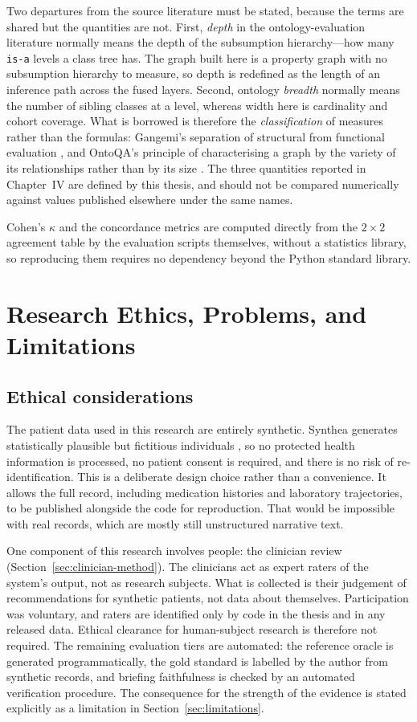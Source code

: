 Two departures from the source literature must be stated, because the terms are shared but
the quantities are not. First, \emph{depth} in the ontology-evaluation literature normally
means the depth of the subsumption hierarchy---how many \texttt{is-a} levels a class tree
has. The graph built here is a property graph with no subsumption hierarchy to measure, so
depth is redefined as the length of an inference path across the fused layers. Second,
ontology \emph{breadth} normally means the number of sibling classes at a level, whereas
width here is cardinality and cohort coverage. What is borrowed is therefore the
\emph{classification} of measures rather than the formulas: Gangemi's separation of structural
from functional evaluation \cite{gangemi2006}, and OntoQA's principle of characterising a graph
by the variety of its relationships rather than by its size \cite{tartir2005}. The three
quantities reported in Chapter~IV are defined by this thesis, and should not be compared
numerically against values published elsewhere under the same names.

Cohen's $\kappa$ and the concordance metrics are computed directly from the
$2\times2$ agreement table by the evaluation scripts themselves, without a statistics
library, so reproducing them requires no dependency beyond the Python standard library.

\section{Research Ethics, Problems, and Limitations}
\label{sec:ethics}

\subsection{Ethical considerations}
The patient data used in this research are entirely synthetic. Synthea generates
statistically plausible but fictitious individuals \cite{synthea}, so no protected health
information is processed, no patient consent is required, and there is no risk of
re-identification. This is a deliberate design choice rather than a convenience. It allows the full record,
including medication histories and laboratory trajectories, to be published alongside the
code for reproduction. That would be impossible with real records, which are mostly still
unstructured narrative text.

One component of this research involves people: the clinician review
(Section~\ref{sec:clinician-method}). The clinicians act as expert raters of the system's
output, not as research subjects. What is collected is their judgement of recommendations for
synthetic patients, not data about themselves. Participation was voluntary, and raters are
identified only by code in the thesis and in any released data. Ethical clearance for
human-subject research is therefore not required. The remaining evaluation tiers are
automated: the reference oracle is generated programmatically, the gold standard is labelled
by the author from synthetic records, and briefing faithfulness is checked by an automated
verification procedure. The consequence for the strength of the evidence is stated
explicitly as a limitation in Section~\ref{sec:limitations}.

